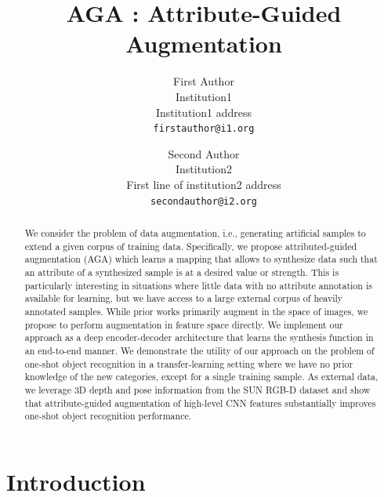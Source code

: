 \documentclass[10pt,twocolumn,letterpaper]{article}
\begin{document}
\title{AGA : Attribute-Guided Augmentation}

\author{First Author\\
Institution1\\
Institution1 address\\
{\tt\small firstauthor@i1.org}
\and
Second Author\\
Institution2\\
First line of institution2 address\\
{\tt\small secondauthor@i2.org}
}

\maketitle

\begin{abstract}
We consider the problem of data augmentation, i.e., generating artificial
samples to extend a given corpus of training data. Specifically, we propose
attributed-guided augmentation (AGA) which learns a mapping
that allows to synthesize data such that an attribute of a synthesized sample 
is at a desired value or strength. This is particularly interesting in situations 
where little data with no attribute annotation is available for learning, but 
we have access to a large external corpus of heavily annotated samples. 
While prior works primarily augment in the space of images,
we propose to perform augmentation in feature space directly.
We implement our approach as a deep encoder-decoder architecture that 
learns the synthesis function in an end-to-end manner. 
We demonstrate the utility of our approach on the problem of 
one-shot object recognition in a transfer-learning setting where
we have no prior knowledge of the new categories, except for 
a single training sample.
As external data, we leverage 3D depth and pose information from the 
SUN RGB-D dataset and show that attribute-guided augmentation of
high-level CNN features substantially improves one-shot object recognition 
performance.
\end{abstract}

\section{Introduction}
\label{section:introduction}
\end{document}
